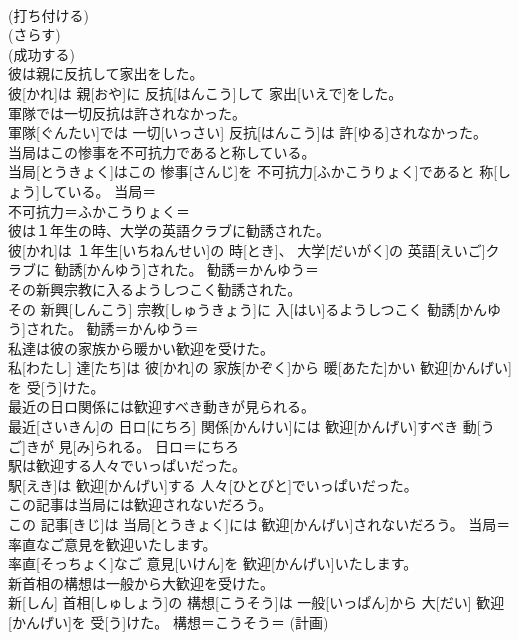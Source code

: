 \documentclass[8pt]{extreport}
\begin{document}
\begin{CJK}{UTF8}{min}
{\\	(打ち付ける) 
\\	(さらす) 
\\	(成功する) 
\\	彼は親に反抗して家出をした。	
\\	彼[かれ]は 親[おや]に 反抗[はんこう]して 家出[いえで]をした。	
\\	軍隊では一切反抗は許されなかった。	
\\	軍隊[ぐんたい]では 一切[いっさい] 反抗[はんこう]は 許[ゆる]されなかった。	
\\	当局はこの惨事を不可抗力であると称している。	
\\	当局[とうきょく]はこの 惨事[さんじ]を 不可抗力[ふかこうりょく]であると 称[しょう]している。	当局＝ 
\\	不可抗力＝ふかこうりょく＝ 
\\	彼は１年生の時、大学の英語クラブに勧誘された。	
\\	彼[かれ]は １年生[いちねんせい]の 時[とき]、 大学[だいがく]の 英語[えいご]クラブに 勧誘[かんゆう]された。	勧誘＝かんゆう＝ 
\\	その新興宗教に入るようしつこく勧誘された。	
\\	その 新興[しんこう] 宗教[しゅうきょう]に 入[はい]るようしつこく 勧誘[かんゆう]された。	勧誘＝かんゆう＝ 
\\	私達は彼の家族から暖かい歓迎を受けた。	
\\	私[わたし] 達[たち]は 彼[かれ]の 家族[かぞく]から 暖[あたた]かい 歓迎[かんげい]を 受[う]けた。	
\\	最近の日ロ関係には歓迎すべき動きが見られる。	
\\	最近[さいきん]の 日ロ[にちろ] 関係[かんけい]には 歓迎[かんげい]すべき 動[うご]きが 見[み]られる。	日ロ＝にちろ
\\	駅は歓迎する人々でいっぱいだった。	
\\	駅[えき]は 歓迎[かんげい]する 人々[ひとびと]でいっぱいだった。	
\\	この記事は当局には歓迎されないだろう。	
\\	この 記事[きじ]は 当局[とうきょく]には 歓迎[かんげい]されないだろう。	当局＝ 
\\	率直なご意見を歓迎いたします。	
\\	率直[そっちょく]なご 意見[いけん]を 歓迎[かんげい]いたします。	
\\	新首相の構想は一般から大歓迎を受けた。	
\\	新[しん] 首相[しゅしょう]の 構想[こうそう]は 一般[いっぱん]から 大[だい] 歓迎[かんげい]を 受[う]けた。	構想＝こうそう＝ (計画) 
}
\end{CJK}
\end{document}
